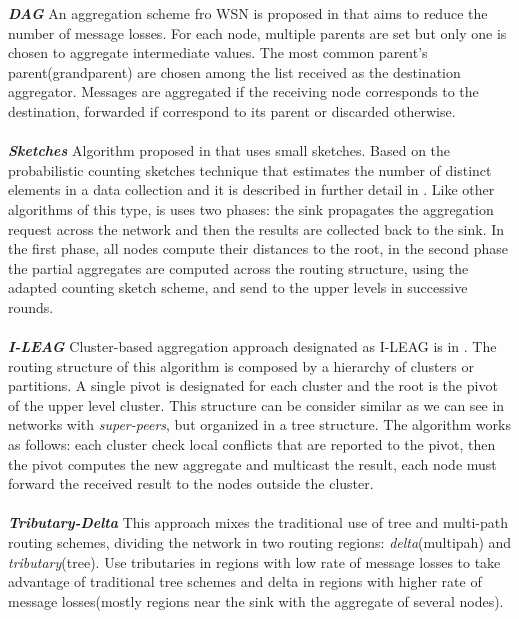 \textbf{\textit{DAG}} An aggregation scheme fro WSN is proposed in \cite{motegi2006dag} that aims to reduce the number of message losses. For each node, multiple parents are set but only one is chosen to aggregate intermediate values. The most common parent's parent(grandparent) are chosen among the list received as the destination aggregator. Messages are aggregated if the receiving node corresponds to the destination, forwarded if correspond to its parent or discarded otherwise.\\
\\

\textbf{\textit{Sketches}} Algorithm proposed in \cite{considine2004approximate} that uses small sketches. Based on the probabilistic counting sketches technique that estimates the number of distinct elements in a data collection and it is described in further detail in \cite{fan2008efficient}. Like other algorithms of this type, is uses two phases: the sink propagates the aggregation request across the network and then the results are collected back to the sink. In the first phase, all nodes compute their distances to the root, in the second phase the partial aggregates are computed across the routing structure, using the adapted counting sketch scheme, and send to the upper levels in successive rounds.\\
\\
\textbf{\textit{I-LEAG}} Cluster-based aggregation approach designated as I-LEAG is in \cite{birk2006veracity}. The routing structure of this algorithm is composed by a hierarchy of clusters or partitions. A single pivot is designated for each cluster and the root is the pivot of the upper level cluster. This structure can be consider similar as we can see in networks with \textit{super-peers}, but organized in a tree structure. The algorithm works as follows: each cluster check local conflicts that are reported to the pivot, then the pivot computes the new aggregate and multicast the result, each node must forward the received result to the nodes outside the cluster.\\
\\
\textbf{\textit{Tributary-Delta}} 
This approach mixes the traditional use of tree and multi-path routing schemes, dividing the network in two routing regions: \textit{delta}(multipah) and \textit{tributary}(tree). Use tributaries in regions with low rate of message losses to take advantage of traditional tree schemes and delta in regions with higher rate of message losses(mostly regions near the sink with the aggregate of several nodes).

